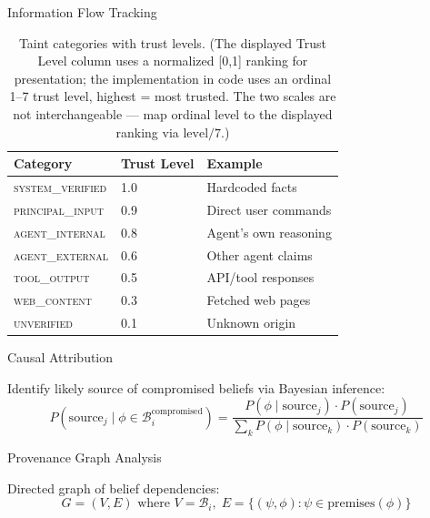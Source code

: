 \documentclass[
  ignorenonframetext,
]{beamer}
\begin{document}
\begin{frame}[allowframebreaks]{Information Flow Tracking}
\begin{table}[htbp]
\centering
\caption{Taint categories with trust levels. (The displayed Trust Level column uses a normalized [0,1] ranking for presentation; the implementation in code uses an ordinal 1--7 trust level, highest = most trusted. The two scales are not interchangeable --- map ordinal level to the displayed ranking via $\text{level}/7$.)}
\label{tab:taint-categories}
\begin{tabular}{@{}lll@{}}
\toprule
Category & Trust Level & Example \\
\midrule
\textsc{system\_verified} & 1.0 & Hardcoded facts \\
\textsc{principal\_input} & 0.9 & Direct user commands \\
\textsc{agent\_internal} & 0.8 & Agent's own reasoning \\
\textsc{agent\_external} & 0.6 & Other agent claims \\
\textsc{tool\_output} & 0.5 & API/tool responses \\
\textsc{web\_content} & 0.3 & Fetched web pages \\
\textsc{unverified} & 0.1 & Unknown origin \\
\bottomrule
\end{tabular}
\end{table}
\end{frame}

\begin{frame}[allowframebreaks]{Causal Attribution}
\protect{}\label{causal-attribution}
\begin{definition}
\label{def:causal-attribution}
Identify likely source of compromised beliefs via Bayesian inference:
\begin{equation}
\label{eq:causal-attribution}
P(\text{source}_j \mid \phi \in \mathcal{B}_i^{\text{compromised}}) = \frac{P(\phi \mid \text{source}_j) \cdot P(\text{source}_j)}{\sum_k P(\phi \mid \text{source}_k) \cdot P(\text{source}_k)}
\end{equation}
\end{definition}
\end{frame}

\begin{frame}[allowframebreaks]{Provenance Graph Analysis}
\protect{}\label{provenance-graph-analysis}
\begin{definition}
\label{def:provenance-graph}
Directed graph of belief dependencies:
\begin{equation}
\label{eq:provenance-graph}
G = (V, E) \text{ where } V = \mathcal{B}_i, \; E = \{(\psi, \phi) : \psi \in \text{premises}(\phi)\}
\end{equation}
\end{definition}

\end{frame}
\end{document}
